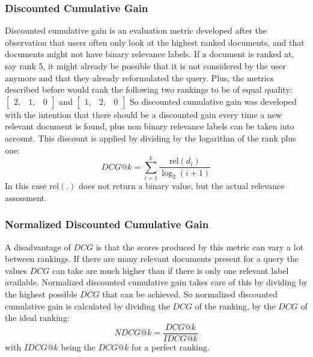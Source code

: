 \subsubsection{Discounted Cumulative Gain}
Discounted cumulative gain is an evaluation metric developed after the observation that users often only look at the highest ranked documents, and that documents might not have binary relevance labels.
If a document is ranked at, say rank 5, it might already be possible that it is not considered by the user anymore and that they already reformulated the query. Plus, the metrics described before would rank the following two rankings to be of equal quality: 
$\left[
\begin{smallmatrix}
	2, & 1, & 0
\end{smallmatrix}
\right]$ and $\left[
\begin{smallmatrix}
	1, & 2, & 0
\end{smallmatrix}
\right]$
So discounted cumulative gain was developed with the intention that there should be a discounted gain every time a new relevant document is found, plus non binary relevance labels can be taken into account. This discount is applied by dividing by the logarithm of the rank plus one: 
\begin{equation}
	\textit{DCG}@k = \sum^k_{i=1} \frac{\text{rel}(d_i)}{\log_2(i+1)}
\end{equation}
In this case $\text{rel}(.)$ does not return a binary value, but the actual relevance assessment.

\subsubsection{Normalized Discounted Cumulative Gain}
A disadvantage of $\textit{DCG}$ is that the scores produced by this metric can vary a lot between rankings. If there are many relevant documents present for a query the values $\textit{DCG}$ can take are much higher than if there is only one relevant label available. Normalized discounted cumulative gain takes care of this by dividing by the highest possible $\textit{DCG}$ that can be achieved. So normalized discounted cumulative gain is calculated by dividing the $\textit{DCG}$ of the ranking, by the $\textit{DCG}$ of the ideal ranking:  
\begin{equation}
	\textit{NDCG}@k = \frac{\textit{DCG}@k}{\textit{IDCG}@k} 
\end{equation}
with $\textit{IDCG}@k$ being the $\textit{DCG}@k$ for a perfect ranking. 

